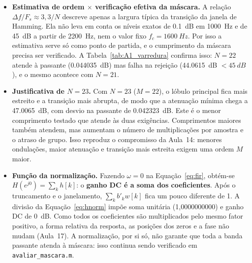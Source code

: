 \documentclass[11pt,a4paper]{article}
\newcommand{\MetricaASomaCoefs}{1{,}0000000000}
\begin{document}
\begin{itemize}[leftmargin=1.5em, itemsep=3pt]
    \item \textbf{Estimativa de ordem $\times$ verificação efetiva da máscara.} A relação $\Delta f/F_s \approx 3,3/N$ descreve apenas a largura típica da transição da janela de Hamming. Ela não leva em conta os níveis exatos de \SI{0,1}{dB} em \SI{1000}{Hz} e de \SI{45}{dB} a partir de \SI{2200}{Hz}, nem o valor fixo $f_c = \SI{1600}{Hz}$. Por isso a estimativa serve só como ponto de partida, e o cumprimento da máscara precisa ser verificado. A Tabela~\ref{tab:A1_varredura} confirma isso: $N = 22$ atende à passante (\SI{0,044035}{dB}) mas falha na rejeição (\SI{44,0615}{dB} $< \SI{45}{dB}$), e o mesmo acontece com $N = 21$.

    \item \textbf{Justificativa de $N = 23$.} Com $N = 23$ ($M = 22$), o lóbulo principal fica mais estreito e a transição mais abrupta, de modo que a atenuação mínima chega a \SI{47,0065}{dB}, com desvio na passante de \SI{0,042323}{dB}. Este é o menor comprimento testado que atende às duas exigências. Comprimentos maiores também atendem, mas aumentam o número de multiplicações por amostra e o atraso de grupo. Isso reproduz o compromisso da Aula~14: menores ondulações, maior atenuação e transição mais estreita exigem uma ordem $M$ maior.

    \item \textbf{Função da normalização.} Fazendo $\omega = 0$ na Equação~\eqref{eq:fir}, obtém-se $H(e^{j0}) = \sum_k h[k]$: o \textbf{ganho DC é a soma dos coeficientes}. Após o truncamento e o janelamento, $\sum_k b'_k w[k]$ fica um pouco diferente de 1. A divisão da Equação~\eqref{eq:hnorm} impõe soma unitária (\MetricaASomaCoefs) e ganho DC de \SI{0}{dB}. Como todos os coeficientes são multiplicados pelo mesmo fator positivo, a forma relativa da resposta, as posições dos zeros e a fase não mudam (Aula~17). A normalização, por si só, não garante que toda a banda passante atenda à máscara: isso continua sendo verificado em \texttt{avaliar\_mascara.m}.


\end{itemize}
\end{document}
